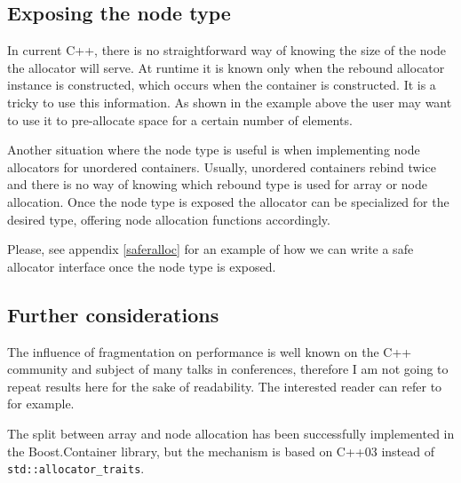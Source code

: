 \documentclass[11pt]{article}
\begin{document}
\subsection{Exposing the node type}

In current C++, there is no straightforward way of knowing the size of the node
the allocator will serve.  At runtime it is known only when the rebound
allocator instance is constructed, which occurs when the container is
constructed. It is a tricky to use this information. As shown in the example
above the user may want to use it to pre-allocate space for a
certain number of elements.

Another situation where the node type is useful is when implementing node
allocators for unordered containers. Usually, unordered containers rebind
twice and there is no way of knowing which rebound type is used for array or
node allocation. Once the node type is exposed the allocator can be specialized
for the desired type, offering node allocation functions accordingly.

Please, see appendix \ref{saferalloc} for an example of how we can write a safe
allocator interface once the node type is exposed.

%


\subsection{Further considerations}
The influence of fragmentation on performance is well known on the C++
community and subject of many talks in conferences, therefore I am not going to
repeat results here for the sake of readability. The interested reader can
refer to \cite{chandler, meyers} for example.

The split between array and node allocation has been successfully implemented
in the Boost.Container library, but the mechanism is based on C++03 instead of
\texttt{std::allocator\_traits}.
\end{document}
